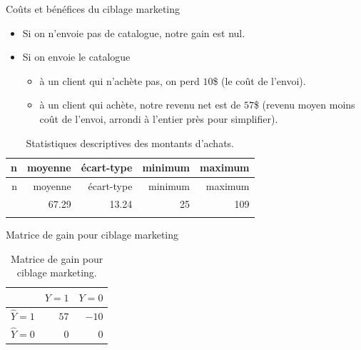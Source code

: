 \documentclass[
  ignorenonframetext,
]{beamer}
\providecommand{\tightlist}{%
  \setlength{\itemsep}{0pt}\setlength{\parskip}{0pt}}\usepackage{longtable,booktabs,array}
\begin{document}
\begin{frame}{Coûts et bénéfices du ciblage marketing}
\protect\hypertarget{couxfbts-et-buxe9nuxe9fices-du-ciblage-marketing}{}
\begin{itemize}
\tightlist
\item
  Si on n'envoie pas de catalogue, notre gain est nul.
\item
  Si on envoie le catalogue

  \begin{itemize}
  \tightlist
  \item
    à un client qui n'achète pas, on perd \(10\)\$ (le coût de l'envoi).
  \item
    à un client qui achète, notre revenu net est de \(57\)\$ (revenu
    moyen moins coût de l'envoi, arrondi à l'entier près pour
    simplifier).
  \end{itemize}
\end{itemize}

\hypertarget{tbl-dbm-ymontant-apprentissage}{}
\begin{longtable}[]{@{}rrrrr@{}}
\caption{\label{tbl-dbm-ymontant-apprentissage}Statistiques descriptives
des montants d'achats.}\tabularnewline
\toprule\noalign{}
n & moyenne & écart-type & minimum & maximum \\
\midrule\noalign{}
\endfirsthead
\toprule\noalign{}
n & moyenne & écart-type & minimum & maximum \\
\midrule\noalign{}
\endhead
210 & 67.29 & 13.24 & 25 & 109 \\
\bottomrule\noalign{}
\end{longtable}
\end{frame}

\begin{frame}{Matrice de gain pour ciblage marketing}
\protect\hypertarget{matrice-de-gain-pour-ciblage-marketing}{}
\hypertarget{tbl-tableconfumat5}{}
\begin{table}
\caption{\label{tbl-tableconfumat5}Matrice de gain pour ciblage marketing. }\tabularnewline

\centering
\begin{tabular}{lrr}
\toprule
  & \(Y=1\) & \(Y=0\)\\
\midrule
\(\widehat{Y}=1\) & $57$ & $-10$\\
\(\widehat{Y}=0\) & $0$ & $0$\\
\bottomrule
\end{tabular}
\end{table}
\end{frame}
\end{document}
